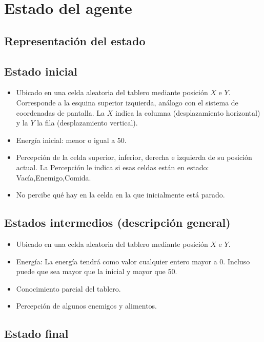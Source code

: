 \section{Estado del agente}

\subsection{Representación del estado}

\subsection{Estado inicial}

\begin{itemize}
\item Ubicado en una celda aleatoria del tablero mediante posición $X$ e $Y$. Corresponde a la esquina superior izquierda, análogo con el sistema de coordenadas de pantalla. La $X$ indica la columna (desplazamiento horizontal) y la $Y$ la fila (desplazamiento vertical).
\item Energía inicial: menor o igual a 50.
\item Percepción de la celda superior, inferior, derecha e izquierda de su posición actual. La Percepción le indica si esas celdas están en estado: Vacía,Enemigo,Comida.
\item No percibe qué hay en la celda en la que inicialmente está parado.
\end{itemize}

\subsection{Estados intermedios (descripción general)}

\begin{itemize}
\item Ubicado en una celda aleatoria del tablero mediante posición $X$ e $Y$.
\item Energía: La energía tendrá como valor cualquier entero mayor a 0. Incluso puede que sea mayor que la inicial y mayor que 50.
\item Conocimiento parcial del tablero.
\item Percepción de algunos enemigos y alimentos.
\end{itemize}

\subsection{Estado final}

